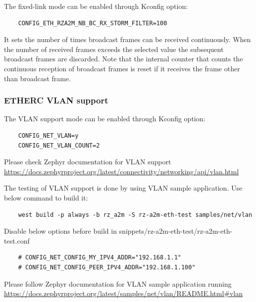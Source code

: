 \documentclass[11pt,a4paper,oneside]{article}
\begin{document}
The fixed-link mode can be enabled through Kconfig option:
\begin{lstlisting}
	CONFIG_ETH_RZA2M_NB_BC_RX_STORM_FILTER=100
\end{lstlisting}

It sets the number of times broadcast frames can be received continuously.
When the number of received frames exceeds the selected value the subsequent broadcast frames are discarded.
Note that the internal counter that counts the continuous reception of broadcast frames is reset if it receives the frame other than broadcast frame.

\subsubsection{ETHERC VLAN support}\label{eth-vlan-support}

The VLAN support mode can be enabled through Kconfig option:
\begin{lstlisting}
	CONFIG_NET_VLAN=y
	CONFIG_NET_VLAN_COUNT=2
\end{lstlisting}

Please check Zephyr documentation for VLAN support
\url{https://docs.zephyrproject.org/latest/connectivity/networking/api/vlan.html}

The testing of VLAN support is done by using VLAN sample application. Use below command to build it:
\begin{lstlisting}
	west build -p always -b rz_a2m -S rz-a2m-eth-test samples/net/vlan
\end{lstlisting}

Disable below options before build in snippets/rz-a2m-eth-test/rz-a2m-eth-test.conf
\begin{lstlisting}
	# CONFIG_NET_CONFIG_MY_IPV4_ADDR="192.168.1.1"
	# CONFIG_NET_CONFIG_PEER_IPV4_ADDR="192.168.1.100"

\end{lstlisting}

Please follow Zephyr documentation for VLAN sample application running
\url{https://docs.zephyrproject.org/latest/samples/net/vlan/README.html#vlan}
\end{document}
